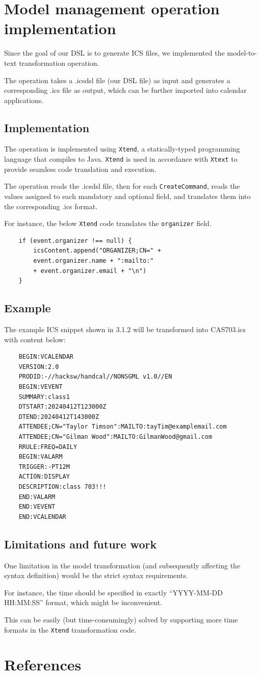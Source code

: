 \documentclass[12pt, letterpaper, twoside]{article}
\begin{document}
\section{Model management operation implementation}
Since the goal of our DSL is to generate ICS files, we implemented the model-to-text transformation operation. 

The operation takes a .icsdsl file (our DSL file) as input and generates a corresponding .ics file as output, which can be further imported into calendar applications.

\subsection{Implementation}

The operation is implemented using \texttt{Xtend}, a statically-typed programming language that compiles to Java. 
\texttt{Xtend} is used in accordance with \texttt{Xtext} to provide seamless code translation and execution. 

The operation reads the .icsdsl file, then for each \texttt{CreateCommand}, reads the values assigned to each mandatory and optional field, and translates them into the corresponding .ics format.

For instance, the below \texttt{Xtend} code translates the \texttt{organizer} field.
\begin{verbatim}
    if (event.organizer !== null) {
        icsContent.append("ORGANIZER;CN=" + 
        event.organizer.name + ":mailto:" 
        + event.organizer.email + "\n")
    }
\end{verbatim}

\subsection{Example}
The example ICS snippet shown in 3.1.2 will be transformed into CAS703.ics with content below:
\begin{verbatim}
    BEGIN:VCALENDAR
    VERSION:2.0
    PRODID:-//hacksw/handcal//NONSGML v1.0//EN
    BEGIN:VEVENT
    SUMMARY:class1
    DTSTART:20240412T123000Z
    DTEND:20240412T143000Z
    ATTENDEE;CN="Taylor Timson":MAILTO:tayTim@examplemail.com
    ATTENDEE;CN="Gilman Wood":MAILTO:GilmanWood@gmail.com
    RRULE:FREQ=DAILY
    BEGIN:VALARM
    TRIGGER:-PT12M
    ACTION:DISPLAY
    DESCRIPTION:class 703!!!
    END:VALARM
    END:VEVENT
    END:VCALENDAR
\end{verbatim}

\subsection{Limitations and future work}
One limitation in the model transformation (and subsequently affecting the syntax definition) would be the strict syntax requirements.  

For instance, the time should be specified in exactly ``YYYY-MM-DD HH:MM:SS'' format, which might be inconvenient.

This can be easily (but time-consumingly) solved by supporting more time formats in the \texttt{Xtend} transformation code.





\newpage

\section{References}
\end{document}
